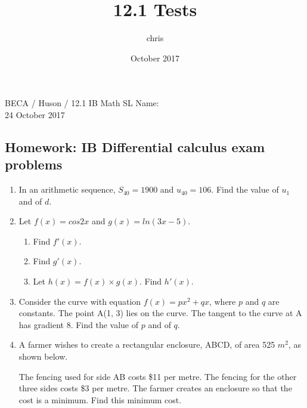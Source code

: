 \documentclass{article}
\title{12.1 Tests}
\author{chris }
\date{October 2017}
\begin{document}
\noindent BECA / Huson / 12.1 IB Math SL \qquad \qquad Name:\\
24 October 2017
\subsection*{Homework: IB Differential calculus exam problems}

\begin{enumerate}

\item In an arithmetic sequence, $S_{40} =1900$ and $u_{40} =106$. Find the value of $u_1$ and of $d$.

\item Let $f(x)=cos2x$ and $g(x)=ln(3x−5)$.
\begin{enumerate}
\item Find $f ′(x)$.
\item Find $g′(x)$.
\item Let $h(x) = f (x)× g (x)$. Find $h′(x)$.
\end{enumerate}

\item Consider the curve with equation $f(x) = px^2 + qx$, where $p$ and $q$ are constants. The point A(1, 3) lies on the curve. The tangent to the curve at A has gradient 8. Find the value of $p$ and of $q$.

\item A farmer wishes to create a rectangular enclosure, ABCD, of area 525 $m^2$, as shown below.

\begin{figure}[!htbp]
\begin{center}
\end{center}
\end{figure}

The fencing used for side AB costs \$11 per metre. The fencing for the other three sides costs \$3 per metre. The farmer creates an enclosure so that the cost is a minimum. Find this minimum cost.

\newpage 


\end{enumerate}
\end{document}
